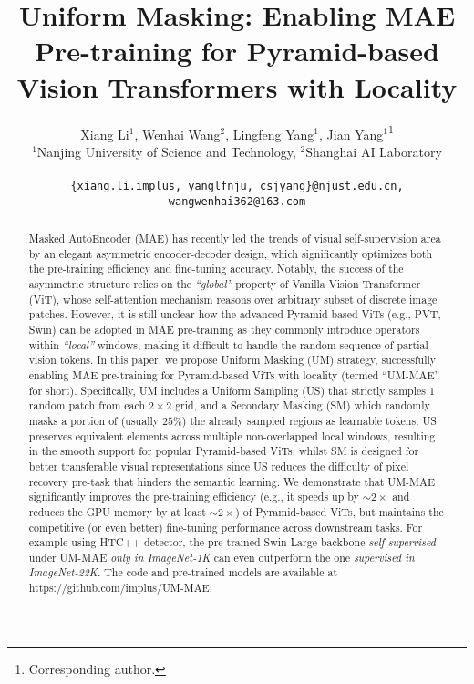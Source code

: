\documentclass{article}
\title{Uniform Masking: Enabling MAE Pre-training for Pyramid-based Vision Transformers with Locality}
\author{Xiang Li$^{1}$, Wenhai Wang$^{2}$, Lingfeng Yang$^{1}$, Jian Yang$^{1}$\thanks{Corresponding author.}
\\
  $^{1}$Nanjing University of Science and Technology, $^{2}$Shanghai AI Laboratory
  \\
  \\
  \texttt{\scriptsize \{xiang.li.implus, yanglfnju, csjyang\}@njust.edu.cn, wangwenhai362@163.com} \\
}
\begin{document}
\maketitle

\begin{abstract}
Masked AutoEncoder (MAE) has recently led the trends of visual self-supervision area by an elegant asymmetric encoder-decoder design, which significantly optimizes both the pre-training efficiency and fine-tuning accuracy. Notably, the success of the asymmetric structure relies on the \emph{``global''} property of Vanilla Vision Transformer (ViT), whose self-attention mechanism reasons over arbitrary subset of discrete image patches. However, it is still unclear how the advanced Pyramid-based ViTs (e.g., PVT, Swin) can be adopted in MAE pre-training as they commonly introduce operators within \emph{``local''} windows, making it difficult to handle the random sequence of partial vision tokens. In this paper, we propose Uniform Masking (UM) strategy, successfully enabling MAE pre-training for Pyramid-based ViTs with locality (termed ``UM-MAE'' for short). Specifically, UM includes a Uniform Sampling (US) that strictly samples $1$ random patch from each $2 \times 2$ grid, and a Secondary Masking (SM) which randomly masks a portion of (usually $25\%$) the already sampled regions as learnable tokens. US preserves equivalent elements across multiple non-overlapped local windows, resulting in the smooth support for popular Pyramid-based ViTs; whilst SM is designed for better transferable visual representations since US reduces the difficulty of pixel recovery pre-task that hinders the semantic learning. We demonstrate that UM-MAE significantly improves the pre-training efficiency (e.g., it speeds up by $\sim 2\times$ and reduces the GPU memory by at least $\sim 2\times$) of Pyramid-based ViTs, but maintains the competitive (or even better) fine-tuning performance across downstream tasks. For example using HTC++ detector, the pre-trained Swin-Large backbone \emph{self-supervised} under UM-MAE \emph{only in ImageNet-1K} can even outperform the one \emph{supervised in ImageNet-22K}.
The code and pre-trained models are available at https://github.com/implus/UM-MAE.






\end{abstract}
\end{document}
